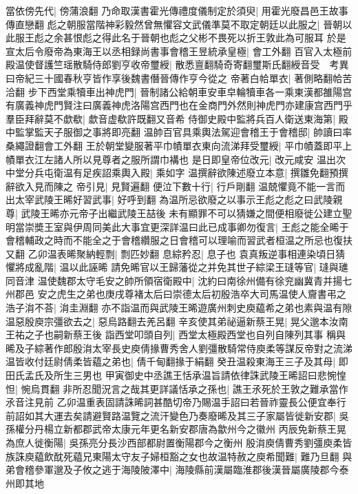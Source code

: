 當依傍先代|{
	傍蒲浪翻}
乃命取漢書霍光傳禮度儀制定於須臾|{
	用霍光廢昌邑王故事傳直戀翻}
彪之朝服當階神彩毅然曾無懼容文武儀準莫不取定朝廷以此服之|{
	晉朝以此服王彪之余甚恨彪之得此名于晉朝也彪之父彬不畏死以折王敦此為可服耳}
於是宣太后令廢帝為東海王以丞相録尚書事會稽王昱統承皇極|{
	會工外翻}
百官入太極前殿温使督護竺瑶散騎侍郎劉亨收帝璽綬|{
	散悉亶翻騎奇寄翻璽斯氏翻綬音受　考異曰帝紀三十國春秋亨皆作享後魏書僭晉傳作亨今從之}
帝著白帢單衣|{
	著側略翻帢苦洽翻}
步下西堂乘犢車出神虎門|{
	晉制諸公給朝車安車皁輪犢車各一乘東漢都雒陽宫有廣義神虎門賢注曰廣義神虎洛陽宫西門也在金商門外然則神虎門亦建康宫西門乎}
羣臣拜辭莫不歔欷|{
	歔音虚欷許既翻又音希}
侍御史殿中監將兵百人衛送東海第|{
	殿中監掌監天子服御之事將即亮翻}
温帥百官具乘輿法駕迎會稽王于會稽邸|{
	帥讀曰率桑繩證翻會工外翻}
王於朝堂變服著平巾幘單衣東向流涕拜受璽綬|{
	平巾幘蓋即平上幘單衣江左諸人所以見尊者之服所謂巾褠也}
是日即皇帝位改元|{
	改元咸安}
温出次中堂分兵屯衛温有足疾詔乘輿入殿|{
	乘如字}
温撰辭欲陳述廢立本意|{
	撰雛免翻預撰辭欲入見而陳之}
帝引見|{
	見賢遍翻}
便泣下數十行|{
	行戶剛翻}
温兢懼竟不能一言而出太宰武陵王晞好習武事|{
	好呼到翻}
為温所忌欲廢之以事示王彪之彪之曰武陵親尊|{
	武陵王晞亦元帝子出繼武陵王喆後}
未有顯罪不可以猜嫌之間便相廢徙公建立聖明當崇奬王室與伊周同美此大事宜更深詳温曰此已成事卿勿復言|{
	王彪之能全晞于會稽輔政之時而不能全之于會稽纘服之日會稽可以理喻而習武者桓温之所忌也復扶又翻}
乙卯温表晞聚納輕剽|{
	剽匹妙翻}
息綜矜忍|{
	息子也}
袁真叛逆事相連染頃日猜懼將成亂階|{
	温以此誣晞}
請免晞官以王歸藩從之并免其世子綜梁王㻱等官|{
	㻱與璡同音津}
温使魏郡太守毛安之帥所領宿衛殿中|{
	沈約曰南徐州備有徐兖幽冀青并揚七州郡邑}
安之虎生之弟也庚戌尊褚太后曰崇德太后初殷浩卒大司馬温使人齎書弔之浩子㳙不荅|{
	㳙圭淵翻}
亦不詣温而與武陵王晞遊廣州刺史庾藴希之弟也素與温有隙温惡殷庾宗彊欲去之|{
	惡烏路翻去羌呂翻}
辛亥使其弟祕逼新蔡王晃|{
	晃父邈本汝南王祐之子也嗣新蔡王後}
詣西堂叩頭自列|{
	西堂太極殿西堂也自列自陳列其事}
稱與晞及子綜著作郎殷㳙太宰長史庾倩掾曹秀舍人劉彊散騎常侍庾柔等謀反帝對之流涕温皆收付廷尉倩柔皆藴之弟也|{
	倩千甸翻掾于絹翻}
癸丑温殺東海王三子及其母|{
	即田氏孟氏及所生三男也}
甲寅御史中丞譙王恬承温旨請依律誅武陵王晞詔曰悲惋惶怛|{
	惋烏貫翻}
非所忍聞況言之哉其更詳議恬承之孫也|{
	譙王氶死於王敦之難承當作氶音注見前}
乙卯温重表固請誅晞詞甚酷切帝乃賜温手詔曰若晉祚靈長公便宜奉行前詔如其大運去矣請避賢路温覽之流汗變色乃奏廢晞及其三子家屬皆徙新安郡|{
	吳孫權分丹楊立新都郡武帝太康元年更名新安郡唐為歙州今之徽州}
丙辰免新蔡王晃為庶人徙衡陽|{
	吳孫亮分長沙西部都尉置衡陽郡今之衡州}
殷㳙庾倩曹秀劉彊庾柔皆族誅庾藴飲酖死藴兄東陽太守友子婦桓豁之女也故温特赦之庾希聞難|{
	難乃旦翻}
與弟會稽參軍邈及子攸之逃于海陵陂澤中|{
	海陵縣前漢屬臨淮郡後漢晉屬廣陵郡今泰州即其地}
